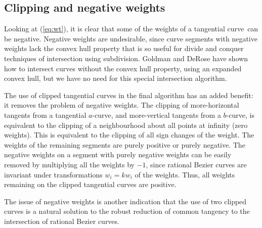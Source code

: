 \documentclass[10pt,twocolumn]{article}
\newcommand{\tang}{tangential curve\ }
\begin{document}
\subsection{Clipping and negative weights}
\label{sec:negative}

Looking at (\ref{eq:wt}),
it is clear that some of the weights of a \tang can be negative.
Negative weights are undesirable, 
since curve segments with negative weights
lack the convex hull property that is so useful for divide and conquer
techniques of intersection using subdivision.
Goldman and DeRose \cite{goldman86} have shown how to intersect curves without
the convex hull property, using an expanded convex hull,
but we have no need for this special intersection algorithm.

The use of clipped tangential curves in the final algorithm
has an added benefit:
it removes the problem of negative weights.
The clipping of more-horizontal tangents from a tangential $a$-curve,
and more-vertical tangents from a $b$-curve, is equivalent to the clipping 
of a neighbourhood about all points at infinity (zero weights).
This is equivalent to the clipping of all sign changes of the weight.
The weights of the remaining segments are purely positive or purely negative.  
The negative weights on a segment with purely negative weights can be easily
removed by multiplying all the weights by $-1$,
since rational Bezier curves are invariant under 
transformations $w_i = kw_i$ of the weights.
Thus, all weights remaining on the clipped tangential curves are positive.

The issue of negative weights is another indication that the use of two clipped
curves is a natural solution to the robust reduction of common tangency
to the intersection of rational Bezier curves.
\end{document}
